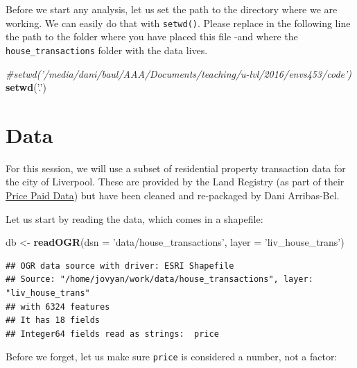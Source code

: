 \documentclass[]{book}
\newenvironment{Shaded}{\begin{snugshade}}{\end{snugshade}}
\newcommand{\CommentTok}[1]{\textcolor[rgb]{0.56,0.35,0.01}{\textit{#1}}}
\newcommand{\DataTypeTok}[1]{\textcolor[rgb]{0.13,0.29,0.53}{#1}}
\newcommand{\KeywordTok}[1]{\textcolor[rgb]{0.13,0.29,0.53}{\textbf{#1}}}
\newcommand{\NormalTok}[1]{#1}
\newcommand{\OperatorTok}[1]{\textcolor[rgb]{0.81,0.36,0.00}{\textbf{#1}}}
\newcommand{\StringTok}[1]{\textcolor[rgb]{0.31,0.60,0.02}{#1}}
\begin{document}
Before we start any analysis, let us set the path to the directory where we are working. We can easily do that with \texttt{setwd()}. Please replace in the following line the path to the folder where you have placed this file -and where the \texttt{house\_transactions} folder with the data lives.

\begin{Shaded}
\begin{Highlighting}[]
\CommentTok{#setwd('/media/dani/baul/AAA/Documents/teaching/u-lvl/2016/envs453/code')}
\KeywordTok{setwd}\NormalTok{(}\StringTok{'.'}\NormalTok{)}
\end{Highlighting}
\end{Shaded}

\hypertarget{data}{%
\section{Data}\label{data}}

For this session, we will use a subset of residential property transaction data for the city of Liverpool. These are provided by the Land Registry (as part of their \href{https://www.gov.uk/government/collections/price-paid-data}{Price Paid Data}) but have been cleaned and re-packaged by Dani Arribas-Bel.

Let us start by reading the data, which comes in a shapefile:

\begin{Shaded}
\begin{Highlighting}[]
\NormalTok{db <-}\StringTok{ }\KeywordTok{readOGR}\NormalTok{(}\DataTypeTok{dsn =} \StringTok{'data/house_transactions'}\NormalTok{, }\DataTypeTok{layer =} \StringTok{'liv_house_trans'}\NormalTok{)}
\end{Highlighting}
\end{Shaded}

\begin{verbatim}
## OGR data source with driver: ESRI Shapefile 
## Source: "/home/jovyan/work/data/house_transactions", layer: "liv_house_trans"
## with 6324 features
## It has 18 fields
## Integer64 fields read as strings:  price
\end{verbatim}

Before we forget, let us make sure \texttt{price} is considered a number, not a factor:

\begin{Shaded}
\end{Shaded}
\end{document}
